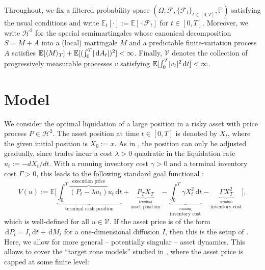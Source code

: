 \documentclass[11pt]{article}
\theoremstyle{definition}
\theoremstyle{remark}
\newcommand{\E}{\mathbb{E}} %
\renewcommand{\P}{\mathbb{P}} %
\newcommand{\F}{\mathcal{F}} %
\DeclarePairedDelimiter{\abs}{\lvert}{\rvert} %
\newcommand{\de}{\,\mathrm{d}}
\begin{document}
Throughout, we fix a filtered probability space $(\Omega, \F, \{\F_t\}_{t\in[0,T]}, \P)$ satisfying the usual conditions and write $\E_t[\cdot] := \E[\cdot \vert \F_t]$ for $t\in[0,T]$.
Moreover, we write $\mathcal{H}^2$ for the special semimartingales whose canonical decomposition $S=M+A$ into a (local) martingale $M$ and a predictable finite-variation process $A$ satisfies $\E[\langle M\rangle_T] + \E[(\int_0^T \abs{\de A_t})^2] < \infty$. Finally, $\mathcal{V}$ denotes the collection of progressively measurable processes $v$ satisfying $\E[\int_0^T \abs{v_t}^2 \de t] < \infty$.


\section{Model}\label{s:model}

We consider the optimal liquidation of a large position in a risky asset with price process $P \in \mathcal{H}^2$. The asset position at time $t \in [0,T]$ is denoted by $X_t$, where the given initial position is $X_0:=x$. As in \cite{almgren.chriss.01}, the position can only be adjusted gradually, since trades incur a cost $\lambda>0$ quadratic in the liquidation rate $u_t := -dX_t/dt$. With a running inventory cost $\gamma>0$ and a terminal inventory cost $\Gamma>0$, this leads to the following standard goal functional \cite{almgren.chriss.01,???}:
\begin{equation}\label{eq:goal}
 V(u):= \E\Bigg[\underbrace{\int_0^T \overbrace{(P_t - \lambda u_t)}^{\textrm{execution price}} u_t \de t}_{\textrm{terminal cash position}} + \underbrace{P_T X_T}_{\stackrel{\textrm{terminal}}{\textrm{asset position}}} - \underbrace{\int_0^T \gamma X_t^2 \de t}_{\stackrel{\textrm{running}}{\textrm{inventory cost}}} - \underbrace{\Gamma X_T^2}_{\stackrel{\textrm{terminal}}{\textrm{inventory cost}}} \Bigg],
\end{equation}
which is well-defined for all $u\in\mathcal V$.
If the asset price is of the form $\de P_t = I_t \de t + \de M_t$ for a one-dimensional diffusion $I$, then this is the setup of \cite{lehalle2017incorporating}. Here, we allow for more general -- potentially singular -- asset dynamics. This allows to cover the ``target zone models'' studied in \cite{neumann.schied.??}, where the asset price is capped at some finite level:
\end{document}
